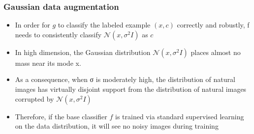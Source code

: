 \documentclass[aspectratio=169%
,serif,mathserif]{beamer}
\begin{document}
\begin{frame}
	\frametitle{Gaussian data augmentation}
	\begin{itemize}
		\item In order for $g$ to classify the labeled example $(x, c)$ 
		correctly and robustly, f needs to consistently classify $\mathcal{N}(x, \sigma^2I)$ as $c$
		\item In high dimension, the Gaussian distribution 
		$\mathcal{N}(x, \sigma^2I)$ places almost no mass near 
		its mode x. 
		\item As a consequence, when σ is moderately high, the distribution 
		of natural images has virtually disjoint support from the 
		distribution of natural images corrupted by $\mathcal{N}(x, \sigma^2I)$
		\item Therefore, if the base classifier $f$ is trained via 
		standard supervised learning on the data distribution, 
		it will see no noisy images during training
	\end{itemize}
	
\end{frame}
\end{document}
